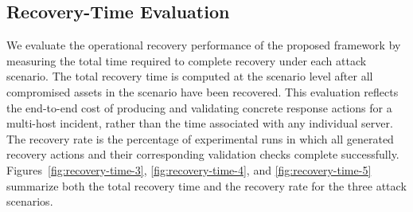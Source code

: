 \documentclass[sigconf]{acmart}
\begin{document}
\subsection{Recovery-Time Evaluation}

We evaluate the operational recovery performance of the proposed framework by
measuring the total time required to complete recovery under each attack
scenario. The total recovery time is computed at the scenario level after all
compromised assets in the scenario have been recovered. This evaluation reflects
the end-to-end cost of producing and validating concrete response actions for a
multi-host incident, rather than the time associated with any individual server.
The recovery rate is the percentage of experimental runs in which all generated
recovery actions and their corresponding validation checks complete
successfully.
Figures~\ref{fig:recovery-time-3}, \ref{fig:recovery-time-4}, and
\ref{fig:recovery-time-5} summarize both the total recovery time and the
recovery rate for the three attack scenarios.
\end{document}
